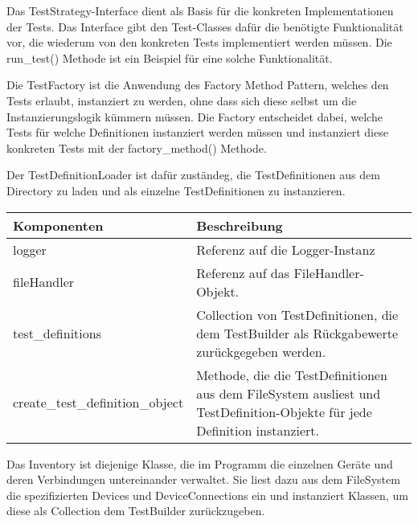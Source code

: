 \documentclass[]{subfiles}
\begin{document}
	Das TestStrategy-Interface dient als Basis für die konkreten Implementationen der Tests. 
	Das Interface gibt den Test-Classes dafür die benötigte Funktionalität vor, die wiederum von den konkreten Tests implementiert werden müssen.
	Die run\_test() Methode ist ein Beispiel für eine solche Funktionalität.

	Die TestFactory ist die Anwendung des Factory Method Pattern, welches den Tests erlaubt, instanziert zu werden, ohne dass sich diese selbst um die Instanzierungslogik kümmern müssen.
	Die Factory entscheidet dabei, welche Tests für welche Definitionen instanziert werden müssen und instanziert diese konkreten Tests mit der factory\_method() Methode.

	\newpage

	Der TestDefinitionLoader ist dafür zuständeg, die TestDefinitionen aus dem Directory zu laden und als einzelne TestDefinitionen zu instanzieren.
	
	\begin{tabularx}{\textwidth}{lX}
		\toprule
			Komponenten & Beschreibung \\
		\midrule
			logger & Referenz auf die Logger-Instanz \\
			fileHandler & Referenz auf das FileHandler-Objekt. \\
			test\_definitions & Collection von TestDefinitionen, die dem TestBuilder als Rückgabewerte zurückgegeben werden. \\
		\midrule
			create\_test\_definition\_object & Methode, die die TestDefinitionen aus dem FileSystem ausliest und TestDefinition-Objekte für jede Definition instanziert. \\
		\bottomrule
	\end{tabularx}

	Das Inventory ist diejenige Klasse, die im Programm die einzelnen Geräte und deren Verbindungen untereinander verwaltet. 
	Sie liest dazu aus dem FileSystem die spezifizierten Devices und DeviceConnections ein und instanziert Klassen, um diese als Collection dem TestBuilder zurückzugeben.
\end{document}
